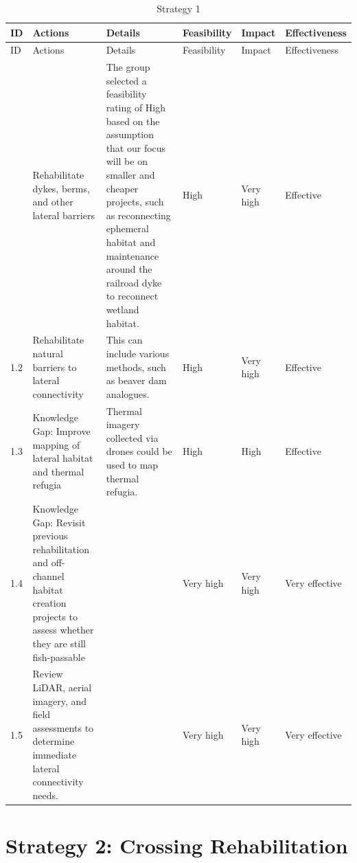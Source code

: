 \documentclass[
  letterpaper,
  DIV=11,
  numbers=noendperiod]{scrreprt}
\begin{document}

\hypertarget{tbl-S1}{}
\begin{longtable}[]{@{}llllll@{}}
\caption{\label{tbl-S1}Strategy 1}\label{T_23b11}\tabularnewline
\toprule\noalign{}
ID & Actions & Details & Feasibility & Impact & Effectiveness \\
\midrule\noalign{}
\endfirsthead
\toprule\noalign{}
ID & Actions & Details & Feasibility & Impact & Effectiveness \\
\midrule\noalign{}
\endhead
\bottomrule\noalign{}
\endlastfoot
1.1 & Rehabilitate dykes, berms, and other lateral barriers & The group
selected a feasibility rating of High based on the assumption that our
focus will be on smaller and cheaper projects, such as reconnecting
ephemeral habitat and maintenance around the railroad dyke to reconnect
wetland habitat. & High & Very high & Effective \\
1.2 & Rehabilitate natural barriers to lateral connectivity & This can
include various methods, such as beaver dam analogues. & High & Very
high & Effective \\
1.3 & Knowledge Gap: Improve mapping of lateral habitat and thermal
refugia & Thermal imagery collected via drones could be used to map
thermal refugia. & High & High & Effective \\
1.4 & Knowledge Gap: Revisit previous rehabilitation and off-channel
habitat creation projects to assess whether they are still fish-passable
& & Very high & Very high & Very effective \\
1.5 & Review LiDAR, aerial imagery, and field assessments to determine
immediate lateral connectivity needs. & & Very high & Very high & Very
effective \\
\end{longtable}

\hypertarget{strategy-2-crossing-rehabilitation}{%
\section*{Strategy 2: Crossing
Rehabilitation}\label{strategy-2-crossing-rehabilitation}}

\end{document}
